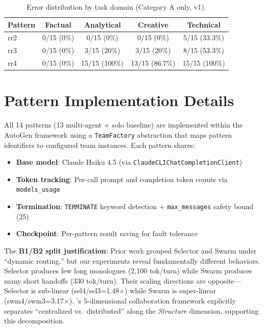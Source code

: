 \documentclass{article}
\begin{document}
\begin{table}[H]
\centering
\caption{Error distribution by task domain (Category A only, v1).}
\label{tab:error_domain}
{\small
\begin{tabular}{@{}lcccc@{}}
\toprule
\textbf{Pattern} & \textbf{Factual} & \textbf{Analytical} & \textbf{Creative} & \textbf{Technical} \\
\midrule
rr2 & 0/15 (0\%) & 0/15 (0\%) & 0/15 (0\%) & 5/15 (33.3\%) \\
rr3 & 0/15 (0\%) & 3/15 (20\%) & 3/15 (20\%) & 8/15 (53.3\%) \\
rr4 & 0/15 (0\%) & 15/15 (100\%) & 13/15 (86.7\%) & 15/15 (100\%) \\
\bottomrule
\end{tabular}
}
\end{table}

\section{Pattern Implementation Details}
\label{app:implementation}

All 14 patterns (13 multi-agent + solo baseline) are implemented within the AutoGen framework using a \texttt{TeamFactory} abstraction that maps pattern identifiers to configured team instances. Each pattern shares:

\begin{itemize}
\item \textbf{Base model}: Claude Haiku 4.5 (via \texttt{ClaudeCLIChatCompletionClient})
\item \textbf{Token tracking}: Per-call prompt and completion token counts via \texttt{models\_usage}
\item \textbf{Termination}: \texttt{TERMINATE} keyword detection + \texttt{max\_messages} safety bound (25)
\item \textbf{Checkpoint}: Per-pattern result saving for fault tolerance
\end{itemize}

The \textbf{B1/B2 split justification}: Prior work grouped Selector and Swarm under ``dynamic routing,'' but our experiments reveal fundamentally different behaviors. Selector produces few long monologues (2,100 tok/turn) while Swarm produces many short handoffs (330 tok/turn). Their scaling directions are opposite---Selector is sub-linear (sel4/sel3=1.48$\times$) while Swarm is super-linear (swm4/swm3=3.17$\times$). \citet{tran2025multiagent}'s 5-dimensional collaboration framework explicitly separates ``centralized vs.\ distributed'' along the \emph{Structure} dimension, supporting this decomposition.
\end{document}
